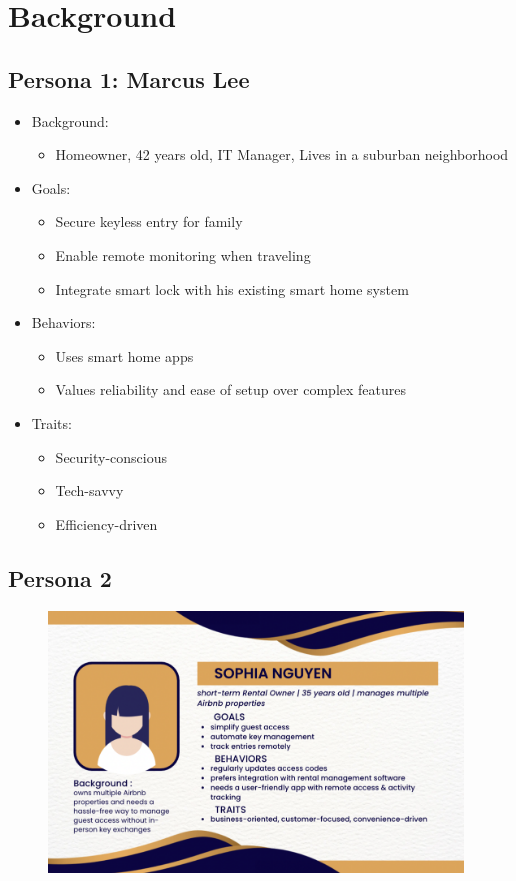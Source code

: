 \section{Background}

\subsection*{Persona 1: Marcus Lee}

\begin{itemize}
    \item Background: 
    \begin{itemize}
        \item Homeowner, 42 years old, IT Manager, Lives in a suburban neighborhood
    \end{itemize}

    \item Goals:
    \begin{itemize}
        \item Secure keyless entry for family
        \item Enable remote monitoring when traveling
        \item Integrate smart lock with his existing smart home system
    \end{itemize}

    \item Behaviors:
    \begin{itemize}
        \item Uses smart home apps
        \item Values reliability and ease of setup over complex features
    \end{itemize}

    \item Traits:
    \begin{itemize}
        \item Security-conscious
        \item Tech-savvy
        \item Efficiency-driven
    \end{itemize}
\end{itemize}


\subsection*{Persona 2}
\begin{figure}[!ht]
    \centering
    \includegraphics[width=110mm,scale=0.4]{./img/Persona2.png}
    \label{fig:persona2}
\end{figure}
\newpage
